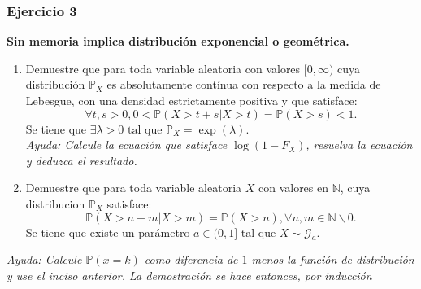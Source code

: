 \documentclass[notitlepage]{article}
\theoremstyle{definition}
\theoremstyle{remark}
\newcommand{\tq}{\text{ tal que }}
\newcommand{\N}{\mathbb{N}}
\begin{document}
	\subsubsection*{Ejercicio 3}
	\textbf{Sin memoria implica distribución exponencial o geométrica.}
	\begin{enumerate}[1)]
		\item Demuestre que para toda variable aleatoria con valores $[0,\infty)$ cuya distribución $\mathbb{P}_X$ es absolutamente contínua con respecto a la medida de Lebesgue, con una densidad estrictamente positiva y que satisface:
		$$\forall t,s>0, 0< \mathbb{P}(X>t+s\vert X>t)=\mathbb{P}(X>s)<1.$$
		Se tiene que $\exists \lambda >0 \tq \mathbb{P}_X=\exp(\lambda)$.
		\\ \textit{Ayuda: Calcule la ecuación que satisface $\log(1-F_X)$, resuelva la ecuación y deduzca el resultado.}
		\item Demuestre que para toda variable aleatoria $X$ con valores en $\N$, cuya distribucion $\mathbb{P}_X$ satisface:
		$$\mathbb{P}(X>n+m\vert X>m)=\mathbb{P}(X>n), \forall n,m \in \N\backslash{0}.$$
		Se tiene que existe un parámetro $a \in (0,1]$ tal que $X \sim \mathcal{G}_a$.
	
		\end{enumerate}
			\textit{Ayuda: Calcule $\mathbb{P} (x = k)$ como diferencia de $1$ menos la función de distribución y use el inciso anterior. La demostración se hace entonces, por inducción}
			
\end{document}

